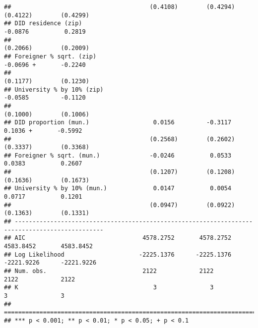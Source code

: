 \documentclass[
]{article}
\begin{document}
\begin{verbatim}
##                                       (0.4108)        (0.4294)       (0.4122)        (0.4299)  
## DID residence (zip)                                                  -0.0876          0.2819   
##                                                                      (0.2066)        (0.2009)  
## Foreigner % sqrt. (zip)                                              -0.0696 +       -0.2240   
##                                                                      (0.1177)        (0.1230)  
## University % by 10% (zip)                                            -0.0585         -0.1120   
##                                                                      (0.1000)        (0.1006)  
## DID proportion (mun.)                  0.0156         -0.3117         0.1036 +       -0.5992   
##                                       (0.2568)        (0.2602)       (0.3337)        (0.3368)  
## Foreigner % sqrt. (mun.)              -0.0246          0.0533         0.0383          0.2607   
##                                       (0.1207)        (0.1208)       (0.1636)        (0.1673)  
## University % by 10% (mun.)             0.0147          0.0054         0.0717          0.1201   
##                                       (0.0947)        (0.0922)       (0.1363)        (0.1331)  
## -----------------------------------------------------------------------------------------------
## AIC                                 4578.2752       4578.2752      4583.8452       4583.8452   
## Log Likelihood                     -2225.1376      -2225.1376     -2221.9226      -2221.9226   
## Num. obs.                           2122            2122           2122            2122        
## K                                      3               3              3               3        
## ===============================================================================================
## *** p < 0.001; ** p < 0.01; * p < 0.05; + p < 0.1
\end{verbatim}
\end{document}
